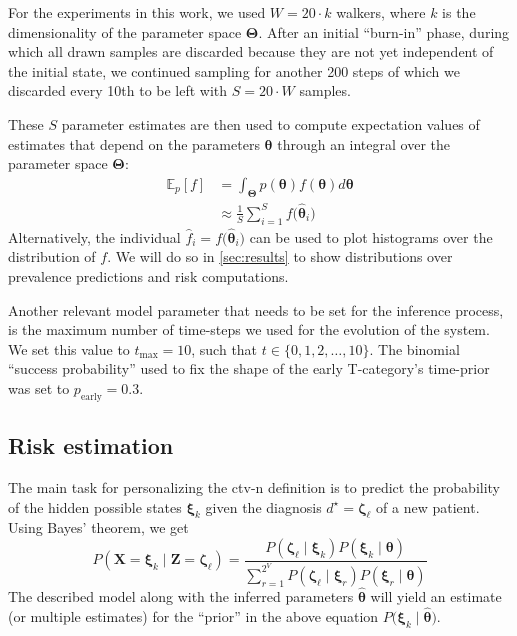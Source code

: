 \documentclass[twocolumn]{aastex631}
\begin{document}
For the experiments in this work, we used $W = 20 \cdot k$ walkers, where $k$ is the dimensionality of the parameter space $\boldsymbol{\Theta}$. After an initial ``burn-in'' phase, during which all drawn samples are discarded because they are not yet independent of the initial state, we continued sampling for another 200 steps of which we discarded every 10th to be left with $S = 20 \cdot W$ samples.

These $S$ parameter estimates are then used to compute expectation values of estimates that depend on the parameters $\boldsymbol{\theta}$ through an integral over the parameter space $\boldsymbol{\Theta}$:
%
\begin{equation}
    \begin{aligned}
        \mathbb{E}_p \left[ f \right] &= \int_{\boldsymbol{\Theta}} p(\boldsymbol{\theta}) f(\boldsymbol{\theta}) d\boldsymbol{\theta} \\
        &\approx \frac{1}{S} \sum_{i=1}^S f \big( \boldsymbol{\hat{\theta}}_i \big)
    \end{aligned}
\end{equation}
%
Alternatively, the individual $\hat{f}_i = f\big( \boldsymbol{\hat{\theta}}_i \big)$ can be used to plot histograms over the distribution of $f$. We will do so in \autoref{sec:results} to show distributions over prevalence predictions and risk computations.

Another relevant model parameter that needs to be set for the inference process, is the maximum number of time-steps we used for the evolution of the system. We set this value to $t_\text{max} = 10$, such that $t \in \{ 0, 1, 2, \ldots, 10 \}$. The binomial ``success probability'' used to fix the shape of the early T-category's time-prior was set to $p_\text{early} = 0.3$.


\subsection{Risk estimation}
\label{subsec:formalism:risk}

The main task for personalizing the \gls{ctv-n} definition is to predict the probability of the hidden possible states $\boldsymbol{\xi}_k$ given the diagnosis $d^\star=\boldsymbol{\zeta}_\ell$ of a new patient. Using Bayes' theorem, we get
%
\begin{equation}
    P\left( \mathbf{X}=\boldsymbol{\xi}_k \mid \mathbf{Z}=\boldsymbol{\zeta}_\ell \right) = \frac{P\left( \boldsymbol{\zeta}_\ell \mid \boldsymbol{\xi}_k \right) P\left( \boldsymbol{\xi}_k \mid \boldsymbol{\theta} \right)}{\sum_{r=1}^{2^V} P\left( \boldsymbol{\zeta}_\ell \mid \boldsymbol{\xi}_r \right) P\left( \boldsymbol{\xi}_r \mid \boldsymbol{\theta} \right) }
\end{equation}
%
The described model along with the inferred parameters $\boldsymbol{\hat{\theta}}$ will yield an estimate (or multiple estimates) for the ``prior'' in the above equation $P\big( \boldsymbol{\xi}_k \mid \boldsymbol{\hat{\theta}} \big)$.
\end{document}
